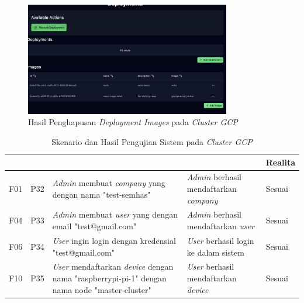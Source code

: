 \begin{figure}[ht]
  \centering
  \includegraphics[width=0.8\textwidth]{resources/chapter-4/pengujian/pengujian-sistem-gcp-09.jpg}
  \caption{Hasil Penghapusan \textit{Deployment Images} pada \textit{Cluster GCP}}
  \label{fig:pengujian-sistem-gcp-09}
\end{figure}

\bgroup
\begin{table}[ht]
  \def\arraystretch{1.3}
  \caption{Skenario dan Hasil Pengujian Sistem pada \textit{Cluster GCP}}
  \label{tab:pengujian-sistem-gcp}
  \centering
  \begin{tabular}{|p{2cm}|p{2cm}|p{4cm}|p{3cm}|p{2cm}|}
    \hline
    \centering{ID Fungsional} & \centering{ID Pengujian} & \centering{Skenario}                                                                                        & \centering{Ekspektasi}                                & Realita \\
    \hline
    F01                       & P32                      & \textit{Admin} membuat \textit{company} yang dengan nama "test-semhas"                                      & \textit{Admin} berhasil mendaftarkan \textit{company} & Sesuai  \\
    \hline
    F04                       & P33                      & \textit{Admin} membuat \textit{user} yang dengan email "test@gmail.com"                                     & \textit{Admin} berhasil mendaftarkan \textit{user}    & Sesuai  \\
    \hline
    F06                       & P34                      & \textit{User} ingin login dengan kredensial "test@gmail.com"                                                & \textit{User} berhasil login ke dalam sistem          & Sesuai  \\
    \hline
    F10                       & P35                      & \textit{User} mendaftarkan \textit{device} dengan nama "raspberrypi-pi-1" dengan nama node "master-cluster" & \textit{User} berhasil mendaftarkan \textit{device}   & Sesuai  \\
    \hline
  \end{tabular}
\end{table}
\egroup

